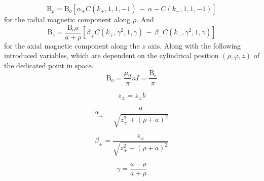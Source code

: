 \begin{equation} \label{eq:cylB_rho}
\mathrm{B}_{\rho} = \mathrm{B}_{o}[\alpha_{+} C(k_{+},1,1,-1) \, - \, \alpha{-} C(k_{-},1,1,-1)]
\end{equation}
for the radial magnetic component along $ \rho $. And
\begin{equation} \label{eq:cylB_z}
\mathrm{B}_{z} = \frac{\mathrm{B}_{o}a}{a+\rho}[\beta_{+} C(k_{+},\gamma^2,1,\gamma) \, - \, \beta_{-} C(k_{-},\gamma^2,1,\gamma)]
\end{equation}
for the axial magnetic component along the $ z $ axis. Along with the following introduced variables, which are dependent on the cylindrical position $ (\rho, \varphi, z) $ of the dedicated point in space.
\begin{equation*}
\mathrm{B}_{o} = \frac{\mu_{0}}{\pi}nI = \frac{\mathrm{B}_{r}}{\pi}
\end{equation*}

\begin{equation*}
z_{\pm} = z_{\pm} b
\end{equation*}

\begin{equation*}
\alpha_{\pm} = \frac{a}{\sqrt{z_{\pm}^2+(\rho+a)^2}}
\end{equation*}

\begin{equation*}
\beta_{\pm} = \frac{z_{\pm}}{\sqrt{z_{\pm}^2+(\rho+a)^2}}
\end{equation*}

\begin{equation*}
\gamma = \frac{a-\rho}{a+\rho}
\end{equation*}

